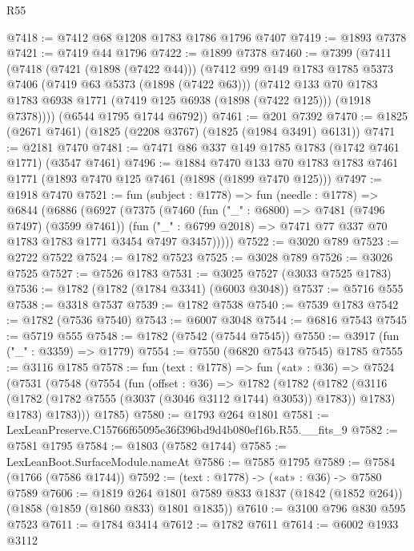 \begin{lexlean}{R55}
\begin{coremodule}
@7418 := @7412 @68 @1208 @1783 @1786 @1796 @7407
@7419 := @1893 @7378
@7421 := @7419 @44 @1796
@7422 := @1899 @7378
@7460 := @7399
    (@7411
      (@7418
        (@7421 (@1898 (@7422 @44)))
        (@7412
          @99
          @149
          @1783
          @1785
          @5373
          @7406
          (@7419 @63 @5373 (@1898 (@7422 @63)))
          (@7412
            @133
            @70
            @1783
            @1783
            @6938
            @1771
            (@7419 @125 @6938 (@1898 (@7422 @125)))
            (@1918 @7378))))
      (@6544 @1795 @1744 @6792))
@7461 := @201 @7392
@7470 := @1825 (@2671 @7461) (@1825 (@2208 @3767) (@1825 (@1984 @3491) @6131))
@7471 := @2181 @7470
@7481 := @7471 @86 @337 @149 @1785 @1783 (@1742 @7461 @1771) (@3547 @7461)
@7496 := @1884
    @7470
    @133
    @70
    @1783
    @1783
    @7461
    @1771
    (@1893 @7470 @125 @7461 (@1898 (@1899 @7470 @125)))
@7497 := @1918 @7470
@7521 := fun (subject : @1778) =>
  fun (needle : @1778) =>
  @6844
    (@6886
      (@6927
        (@7375
          (@7460
            (fun ("_" : @6800) => @7481 (@7496 @7497) (@3599 @7461))
            (fun ("_" : @6799 @2018) => @7471 @77 @337 @70 @1783 @1783 @1771 @3454 @7497 @3457)))))
@7522 := @3020 @789
@7523 := @2722 @7522
@7524 := @1782 @7523
@7525 := @3028 @789
@7526 := @3026 @7525
@7527 := @7526 @1783
@7531 := @3025 @7527 (@3033 @7525 @1783)
@7536 := @1782 (@1782 (@1784 @3341) (@6003 @3048))
@7537 := @5716 @555
@7538 := @3318 @7537
@7539 := @1782 @7538
@7540 := @7539 @1783
@7542 := @1782 (@7536 @7540)
@7543 := @6007 @3048
@7544 := @6816 @7543
@7545 := @5719 @555
@7548 := @1782 (@7542 (@7544 @7545))
@7550 := @3917 (fun ("_" : @3359) => @1779)
@7554 := @7550 (@6820 @7543 @7545) @1785
@7555 := @3116 @1785
@7578 := fun (text : @1778) =>
  fun («at» : @36) =>
  @7524
    (@7531
      (@7548
        (@7554
          (fun (offset : @36) =>
          @1782
            (@1782
              (@1782 (@3116 (@1782 (@1782 @7555 (@3037 (@3046 @3112 @1744) @3053)) @1783)) @1783)
              @1783)
            @1783)))
      @1785)
@7580 := @1793 @264 @1801
@7581 := LexLeanPreserve.C15766f65095e36f396bd9d4b080ef16b.R55.__fits_9
@7582 := @7581 @1795
@7584 := @1803 (@7582 @1744)
@7585 := LexLeanBoot.SurfaceModule.nameAt
@7586 := @7585 @1795
@7589 := @7584 (@1766 (@7586 @1744))
@7592 := (text : @1778) -> («at» : @36) -> @7580 @7589
@7606 := @1819
    @264
    @1801
    @7589
    @833
    @1837
    (@1842 (@1852 @264))
    (@1858 (@1859 (@1860 @833) @1801 @1835))
@7610 := @3100 @796 @830 @595 @7523
@7611 := @1784 @3414
@7612 := @1782 @7611
@7614 := @6002 @1933 @3112

\end{coremodule}
\end{lexlean}
